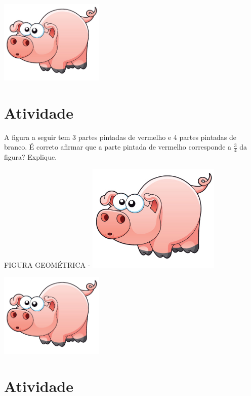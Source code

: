\documentclass[a4,12pt]{book}
\begin{document}
\includegraphics[width=\textwidth,height=4cm, keepaspectratio]{pig}
\section{Atividade}







A figura a seguir tem 3 partes pintadas de vermelho e 4 partes pintadas de branco. É correto afirmar que a parte pintada de vermelho corresponde a $\frac{3}{4}$ da figura? Explique.
\begin{imagem*}[breakable]{}{}   FIGURA GEOMÉTRICA -
    \includegraphics[width=180pt, keepaspectratio]{pig}
\end{imagem*}





\includegraphics[width=\textwidth,height=4cm, keepaspectratio]{pig}
\section{Atividade}
\end{document}
